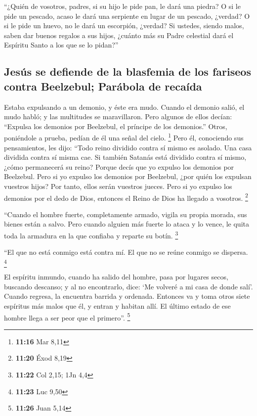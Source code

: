 \begin{paracol}{2}
 ``¿Quién de vosotros, padres, si su hijo le pide pan, le
dará una piedra? O si le pide un pescado, acaso le dará una serpiente en
lugar de un pescado, ¿verdad?  O si le pide un huevo, no
le dará un escorpión, ¿verdad?  Si ustedes, siendo malos,
saben dar buenos regalos a sus hijos, ¿cuánto más su Padre celestial
dará el Espíritu Santo a los que se lo pidan?''

\hypertarget{jesuxfas-se-defiende-de-la-blasfemia-de-los-fariseos-contra-beelzebul-paruxe1bola-de-recauxedda}{%
\subsection{Jesús se defiende de la blasfemia de los fariseos contra
Beelzebul; Parábola de
recaída}\label{jesuxfas-se-defiende-de-la-blasfemia-de-los-fariseos-contra-beelzebul-paruxe1bola-de-recauxedda}}

 Estaba expulsando a un demonio, y éste era mudo. Cuando
el demonio salió, el mudo habló; y las multitudes se maravillaron.
 Pero algunos de ellos decían: ``Expulsa los demonios por
Beelzebul, el príncipe de los demonios.''  Otros,
poniéndole a prueba, pedían de él una señal del cielo. \footnote{\textbf{11:16}
  Mar 8,11}  Pero él, conociendo sus pensamientos, les
dijo: ``Todo reino dividido contra sí mismo es asolado. Una casa
dividida contra sí misma cae.  Si también Satanás está
dividido contra sí mismo, ¿cómo permanecerá su reino? Porque decís que
yo expulso los demonios por Beelzebul.  Pero si yo
expulso los demonios por Beelzebul, ¿por quién los expulsan vuestros
hijos? Por tanto, ellos serán vuestros jueces.  Pero si
yo expulso los demonios por el dedo de Dios, entonces el Reino de Dios
ha llegado a vosotros. \footnote{\textbf{11:20} Éxod 8,19}

 ``Cuando el hombre fuerte, completamente armado, vigila
su propia morada, sus bienes están a salvo.  Pero cuando
alguien más fuerte lo ataca y lo vence, le quita toda la armadura en la
que confiaba y reparte su botín. \footnote{\textbf{11:22} Col 2,15; 1Jn
  4,4}

 ``El que no está conmigo está contra mí. El que no se
reúne conmigo se dispersa. \footnote{\textbf{11:23} Luc 9,50}

 El espíritu inmundo, cuando ha salido del hombre, pasa
por lugares secos, buscando descanso; y al no encontrarlo, dice: `Me
volveré a mi casa de donde salí'.  Cuando regresa, la
encuentra barrida y ordenada.  Entonces va y toma otros
siete espíritus más malos que él, y entran y habitan allí. El último
estado de ese hombre llega a ser peor que el primero''. \footnote{\textbf{11:26}
  Juan 5,14}


\end{paracol}
